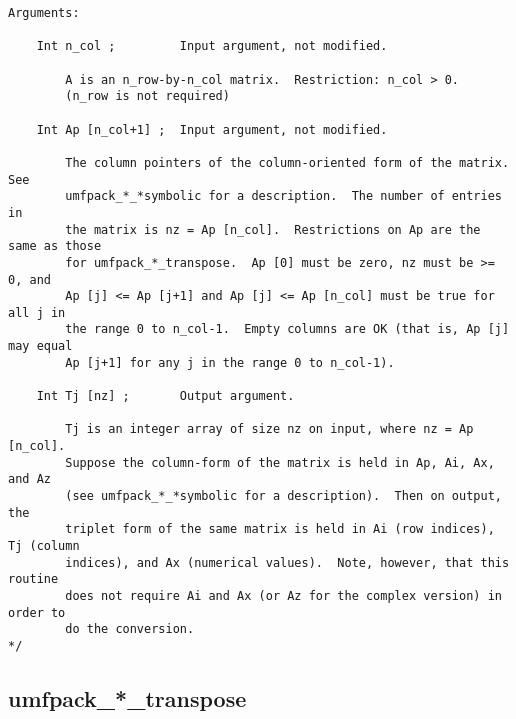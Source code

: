 \documentclass[11pt]{article}
\begin{document}
{\begin{verbatim}
Arguments:

    Int n_col ;         Input argument, not modified.

        A is an n_row-by-n_col matrix.  Restriction: n_col > 0.
        (n_row is not required)

    Int Ap [n_col+1] ;  Input argument, not modified.

        The column pointers of the column-oriented form of the matrix.  See
        umfpack_*_*symbolic for a description.  The number of entries in
        the matrix is nz = Ap [n_col].  Restrictions on Ap are the same as those
        for umfpack_*_transpose.  Ap [0] must be zero, nz must be >= 0, and
        Ap [j] <= Ap [j+1] and Ap [j] <= Ap [n_col] must be true for all j in
        the range 0 to n_col-1.  Empty columns are OK (that is, Ap [j] may equal
        Ap [j+1] for any j in the range 0 to n_col-1).

    Int Tj [nz] ;       Output argument.

        Tj is an integer array of size nz on input, where nz = Ap [n_col].
        Suppose the column-form of the matrix is held in Ap, Ai, Ax, and Az
        (see umfpack_*_*symbolic for a description).  Then on output, the
        triplet form of the same matrix is held in Ai (row indices), Tj (column
        indices), and Ax (numerical values).  Note, however, that this routine
        does not require Ai and Ax (or Az for the complex version) in order to
        do the conversion.
*/
\end{verbatim}
}

\newpage
\subsection{umfpack\_*\_transpose}
\end{document}
